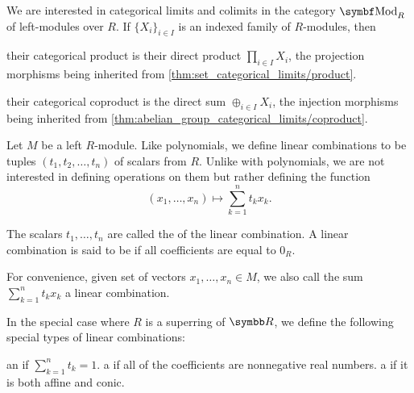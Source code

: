 \begin{proposition}\label{thm:module_categorical_limits}
  We are interested in categorical limits and colimits in the category \( \Cat{Mod}_R \) of left-modules over \( R \). If \( \{ X_i \}_{i \in I} \) is an indexed family of \( R \)-modules, then
  \begin{defenum}
     their categorical product is their direct product \( \prod_{i \in I} X_i \), the projection morphisms being inherited from \cref{thm:set_categorical_limits/product}.

     their categorical coproduct is the direct sum \( \oplus_{i \in I} X_i \), the injection morphisms being inherited from \cref{thm:abelian_group_categorical_limits/coproduct}.
  \end{defenum}
\end{proposition}

\begin{definition}\label{def:linear_combination}
  Let \( M \) be a left \( R \)-module. Like polynomials, we define linear combinations to be tuples \( (t_1, t_2, \ldots, t_n) \) of scalars from \( R \). Unlike with polynomials, we are not interested in defining operations on them but rather defining the function
  \begin{equation}\label{def:linear_combination/function}
    (x_1, \ldots, x_n) \mapsto \sum_{k=1}^n t_k x_k.
  \end{equation}

  The scalars \( t_1, \ldots, t_n \) are called the  of the linear combination. A linear combination is said to be  if all coefficients are equal to \( 0_R \).

  For convenience, given set of vectors \( x_1, \ldots, x_n \in M \), we also call the sum \( \sum_{k=1}^n t_k x_k \) a linear combination.

  In the special case where \( R \) is a superring of \( \BR \), we define the following special types of linear combinations:
  \begin{defenum}
     an  if \( \sum_{k=1}^n t_k = 1 \).
     a  if all of the coefficients are nonnegative real numbers.
     a  if it is both affine and conic.
  \end{defenum}
\end{definition}

